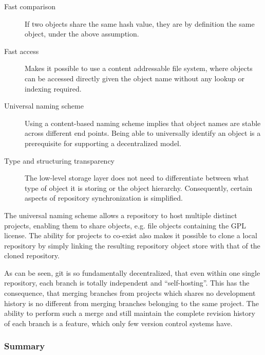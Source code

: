 \begin{description}

\item[Fast comparison]
%
	If two objects share the same hash value, they are by
	definition the same object, under the above assumption.

\item[Fast access]
%
	Makes it possible to use a content addressable file system,
	where objects can be accessed directly given the object name
	without any lookup or indexing required.

\item[Universal naming scheme]
%
	Using a content-based naming scheme implies that object names
	are stable across different end points. Being able to
	universally identify an object is a prerequisite for
	supporting a decentralized model.

\item[Type and structuring transparency]
%
	The low-level storage layer does not need to differentiate
	between what type of object it is storing or the object
	hierarchy. Consequently, certain aspects of repository
	synchronization is simplified.

\end{description}

The universal naming scheme allows a repository to host multiple
distinct projects, enabling them to share objects, e.g. file objects
containing the GPL license. The ability for projects to co-exist also
makes it possible to clone a local repository by simply linking the
resulting repository object store with that of the cloned repository.

As can be seen, git is so fundamentally decentralized, that even
within one single repository, each branch is totally independent and
``self-hosting''. This has the consequence, that merging branches from
projects which shares no development history is no different from
merging branches belonging to the same project. The ability to perform
such a merge and still maintain the complete revision history of each
branch is a feature, which only few version control systems have.

\subsubsection*{Summary}

